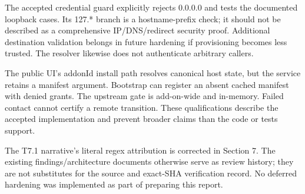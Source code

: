 \documentclass[11pt,letterpaper]{article}
\begin{document}
\vspace{3pt}{\normalsize\bfseries Precision limits for architectural claims}\par
The accepted credential guard explicitly rejects 0.0.0.0 and tests the documented loopback cases. Its 127.* branch is a hostname-prefix check; it should not be described as a comprehensive IP/DNS/redirect security proof. Additional destination validation belongs in future hardening if provisioning becomes less trusted. The resolver likewise does not authenticate arbitrary callers.\par
The public UI's addonId install path resolves canonical host state, but the service retains a manifest argument. Bootstrap can register an absent cached manifest with denied grants. The upstream gate is add-on-wide and in-memory. Failed contact cannot certify a remote transition. These qualifications describe the accepted implementation and prevent broader claims than the code or tests support.\par
The T7.1 narrative's literal regex attribution is corrected in Section 7. The existing findings/architecture documents otherwise serve as review history; they are not substitutes for the source and exact-SHA verification record. No deferred hardening was implemented as part of preparing this report.\par
\end{document}
